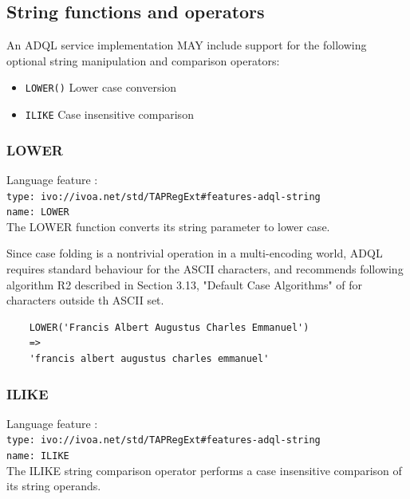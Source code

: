 \documentclass[11pt,a4paper]{ivoa}
\begin{document}
\subsection{String functions and operators}
\label{sec:string.functions}

An ADQL service implementation MAY include support for the following optional
string manipulation and comparison operators:

\begin{itemize}
    \item \verb:LOWER(): Lower case conversion
    \item \verb:ILIKE: Case insensitive comparison
\end{itemize}

\subsubsection{LOWER}
\label{sec:string.functions.lower}
{\footnotesize Language feature :}\\
{\footnotesize \verb|type: ivo://ivoa.net/std/TAPRegExt#features-adql-string|}\\
{\footnotesize \verb|name: LOWER|}\\

The LOWER function converts its string parameter to lower case.

Since case folding is a nontrivial operation in a multi-encoding world,
ADQL requires standard behaviour for the ASCII characters, and recommends
following algorithm R2 described in Section 3.13, "Default Case Algorithms"
of \citet{std:UNICODE} for characters outside th ASCII set.

\begin{verbatim}
    LOWER('Francis Albert Augustus Charles Emmanuel')
    =>
    'francis albert augustus charles emmanuel'
\end{verbatim}

\subsubsection{ILIKE}
\label{sec:string.functions.ilike}
{\footnotesize Language feature :}\\
{\footnotesize \verb|type: ivo://ivoa.net/std/TAPRegExt#features-adql-string|}\\
{\footnotesize \verb|name: ILIKE|}\\

The ILIKE string comparison operator performs a case insensitive comparison
of its string operands.
\end{document}
